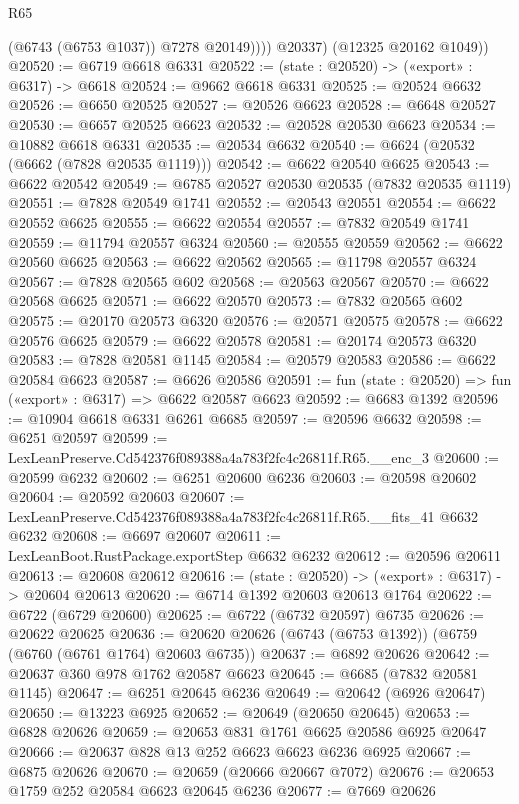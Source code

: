 \begin{lexlean}{R65}
\begin{coremodule}
{                (@6743 (@6753 @1037))
                @7278
                @20149))))
        @20337)
      (@12325 @20162 @1049))
@20520 := @6719 @6618 @6331
@20522 := (state : @20520) -> («export» : @6317) -> @6618
@20524 := @9662 @6618 @6331
@20525 := @20524 @6632
@20526 := @6650 @20525
@20527 := @20526 @6623
@20528 := @6648 @20527
@20530 := @6657 @20525 @6623
@20532 := @20528 @20530 @6623
@20534 := @10882 @6618 @6331
@20535 := @20534 @6632
@20540 := @6624 (@20532 (@6662 (@7828 @20535 @1119)))
@20542 := @6622 @20540 @6625
@20543 := @6622 @20542
@20549 := @6785 @20527 @20530 @20535 (@7832 @20535 @1119)
@20551 := @7828 @20549 @1741
@20552 := @20543 @20551
@20554 := @6622 @20552 @6625
@20555 := @6622 @20554
@20557 := @7832 @20549 @1741
@20559 := @11794 @20557 @6324
@20560 := @20555 @20559
@20562 := @6622 @20560 @6625
@20563 := @6622 @20562
@20565 := @11798 @20557 @6324
@20567 := @7828 @20565 @602
@20568 := @20563 @20567
@20570 := @6622 @20568 @6625
@20571 := @6622 @20570
@20573 := @7832 @20565 @602
@20575 := @20170 @20573 @6320
@20576 := @20571 @20575
@20578 := @6622 @20576 @6625
@20579 := @6622 @20578
@20581 := @20174 @20573 @6320
@20583 := @7828 @20581 @1145
@20584 := @20579 @20583
@20586 := @6622 @20584 @6623
@20587 := @6626 @20586
@20591 := fun (state : @20520) => fun («export» : @6317) => @6622 @20587 @6623
@20592 := @6683 @1392
@20596 := @10904 @6618 @6331 @6261 @6685
@20597 := @20596 @6632
@20598 := @6251 @20597
@20599 := LexLeanPreserve.Cd542376f089388a4a783f2fc4c26811f.R65.__enc_3
@20600 := @20599 @6232
@20602 := @6251 @20600 @6236
@20603 := @20598 @20602
@20604 := @20592 @20603
@20607 := LexLeanPreserve.Cd542376f089388a4a783f2fc4c26811f.R65.__fits_41 @6632 @6232
@20608 := @6697 @20607
@20611 := LexLeanBoot.RustPackage.exportStep @6632 @6232
@20612 := @20596 @20611
@20613 := @20608 @20612
@20616 := (state : @20520) -> («export» : @6317) -> @20604 @20613
@20620 := @6714 @1392 @20603 @20613 @1764
@20622 := @6722 (@6729 @20600)
@20625 := @6722 (@6732 @20597) @6735
@20626 := @20622 @20625
@20636 := @20620 @20626 (@6743 (@6753 @1392)) (@6759 (@6760 (@6761 @1764) @20603 @6735))
@20637 := @6892 @20626
@20642 := @20637 @360 @978 @1762 @20587 @6623
@20645 := @6685 (@7832 @20581 @1145)
@20647 := @6251 @20645 @6236
@20649 := @20642 (@6926 @20647)
@20650 := @13223 @6925
@20652 := @20649 (@20650 @20645)
@20653 := @6828 @20626
@20659 := @20653 @831 @1761 @6625 @20586 @6925 @20647
@20666 := @20637 @828 @13 @252 @6623 @6623 @6236 @6925
@20667 := @6875 @20626
@20670 := @20659 (@20666 @20667 @7072)
@20676 := @20653 @1759 @252 @20584 @6623 @20645 @6236
@20677 := @7669 @20626
}
\end{coremodule}
\end{lexlean}
